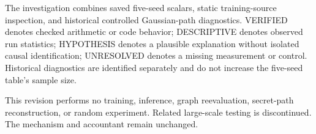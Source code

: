 The investigation combines saved five-seed scalars, static training-source inspection, and historical controlled Gaussian-path diagnostics. VERIFIED denotes checked arithmetic or code behavior; DESCRIPTIVE denotes observed run statistics; HYPOTHESIS denotes a plausible explanation without isolated causal identification; UNRESOLVED denotes a missing measurement or control. Historical diagnostics are identified separately and do not increase the five-seed table's sample size.

This revision performs no training, inference, graph reevaluation, secret-path reconstruction, or random experiment. Related large-scale testing is discontinued. The mechanism and accountant remain unchanged.

